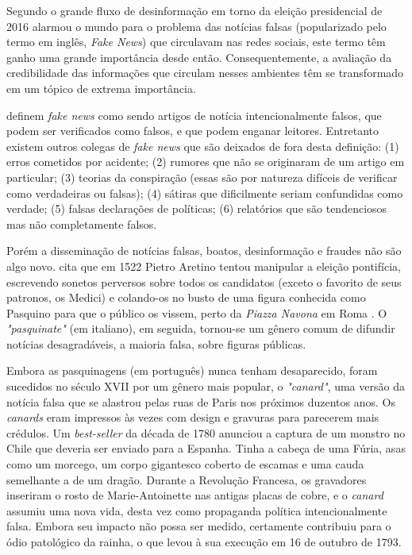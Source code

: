 Segundo \cite{rasmus_kleis_nielsen_news_2017} o grande fluxo de desinformação em torno da eleição presidencial de 2016 alarmou o mundo para o problema das notícias falsas (popularizado pelo termo em inglês, \emph{Fake News}) que circulavam nas redes sociais, este termo têm ganho uma grande importância desde então. Consequentemente, a avaliação da credibilidade das informações que circulam nesses ambientes têm se transformado em um tópico de extrema importância.


\cite{allcott_social_2017} definem \emph{fake news} como sendo artigos de notícia intencionalmente falsos, que podem ser verificados como falsos, e que podem enganar leitores. Entretanto existem outros colegas de \emph{fake news} que são deixados de fora desta definição: (1) erros cometidos por acidente; (2) rumores que não se originaram de um artigo em particular; (3) teorias da conspiração (essas são por natureza difíceis de verificar como verdadeiras ou falsas); (4) sátiras que dificilmente seriam confundidas como verdade; (5) falsas declarações de políticas; (6) relatórios que são tendenciosos mas não completamente falsos.



Porém a disseminação de notícias falsas, boatos, desinformação e fraudes não são algo novo. \cite{robert_darnton_true_2017} cita que em 1522 Pietro Aretino tentou manipular a eleição pontifícia, escrevendo sonetos perversos sobre todos os candidatos (exceto o favorito de seus patronos, os Medici) e colando-os no busto de uma figura conhecida como Pasquino para que o público os vissem, perto da \emph{Piazza Navona} em Roma . O \emph{"pasquinate"} (em italiano), em seguida, tornou-se um gênero comum de difundir notícias desagradáveis, a maioria falsa, sobre figuras públicas.

Embora as pasquinagens (em português) nunca tenham desaparecido, foram sucedidos no século XVII por um gênero mais popular, o \emph{"canard"}, uma versão da notícia falsa que se alastrou pelas ruas de Paris nos próximos duzentos anos. Os \emph{canards} eram impressos às vezes com design e gravuras para parecerem mais crédulos. Um \emph{best-seller} da década de 1780 anunciou a captura de um monstro no Chile que deveria ser enviado para a Espanha. Tinha a cabeça de uma Fúria, asas como um morcego, um corpo gigantesco coberto de escamas e uma cauda semelhante a de um dragão. Durante a Revolução Francesa, os gravadores inseriram o rosto de Marie-Antoinette nas antigas placas de cobre, e o \emph{canard} assumiu uma nova vida, desta vez como propaganda política intencionalmente falsa. Embora seu impacto não possa ser medido, certamente contribuiu para o ódio patológico da rainha, o que levou à sua execução em 16 de outubro de 1793.

